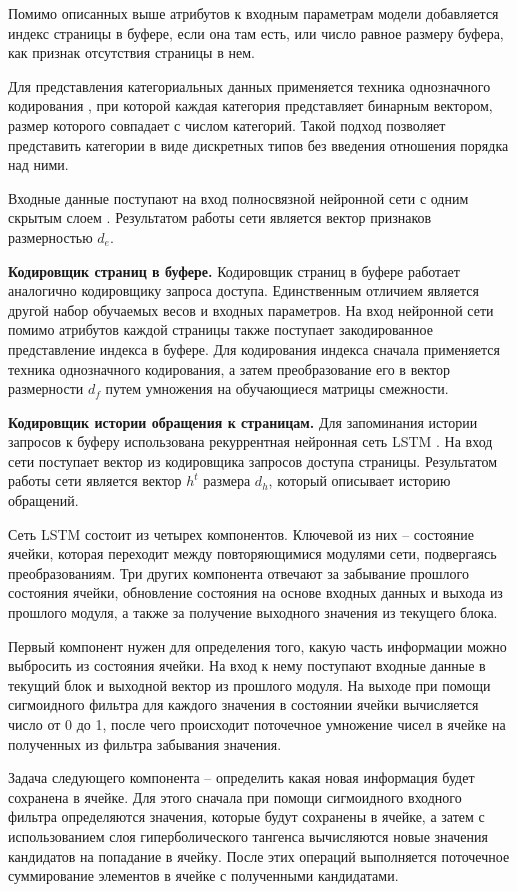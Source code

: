 Помимо описанных выше атрибутов к входным параметрам модели добавляется индекс страницы в буфере, если она там есть, или число равное размеру буфера, как признак отсутствия страницы в нем.

Для представления категориальных данных применяется техника однозначного кодирования \cite{onecode}, при которой каждая категория представляет бинарным вектором, размер которого совпадает с числом категорий.
Такой подход позволяет представить категории в виде дискретных типов без введения отношения порядка над ними.

Входные данные поступают на вход полносвязной нейронной сети с одним скрытым слоем \cite{митина2021перцептрон}.
Результатом работы сети является вектор признаков размерностью $d_e$.

\textbf{Кодировщик страниц в буфере.}
Кодировщик страниц в буфере работает аналогично кодировщику запроса доступа.
Единственным отличием является другой набор обучаемых весов и входных параметров.
На вход нейронной сети помимо атрибутов каждой страницы также поступает закодированное представление индекса в буфере.
Для кодирования индекса сначала применяется техника однозначного кодирования, а затем преобразование его в вектор размерности $d_f$ путем умножения на обучающиеся матрицы смежности.

\textbf{Кодировщик истории обращения к страницам.}
Для запоминания истории запросов к буферу использована рекуррентная нейронная сеть LSTM \cite{yu2019review}.
На вход сети поступает вектор из кодировщика запросов доступа страницы.
Результатом работы сети является вектор $h^t$ размера $d_h$, который описывает историю обращений.

Сеть LSTM состоит из четырех компонентов.
Ключевой из них -- состояние ячейки, которая переходит между повторяющимися модулями сети, подвергаясь преобразованиям.
Три других компонента отвечают за забывание прошлого состояния ячейки, обновление состояния на основе входных данных и выхода из прошлого модуля, а также за получение выходного значения из текущего блока.

Первый компонент нужен для определения того, какую часть информации можно выбросить из состояния ячейки.
На вход к нему поступают входные данные в текущий блок и выходной вектор из прошлого модуля.
На выходе при помощи сигмоидного фильтра для каждого значения в состоянии ячейки вычисляется число от 0 до 1, после чего происходит поточечное умножение чисел в ячейке на полученных из фильтра забывания значения.

Задача следующего компонента -- определить какая новая информация будет сохранена в ячейке.
Для этого сначала при помощи сигмоидного входного фильтра определяются значения, которые будут сохранены в ячейке, а затем с использованием слоя гиперболического тангенса вычисляются новые значения кандидатов на попадание в ячейку.
После этих операций выполняется поточечное суммирование элементов в ячейке с полученными кандидатами.

